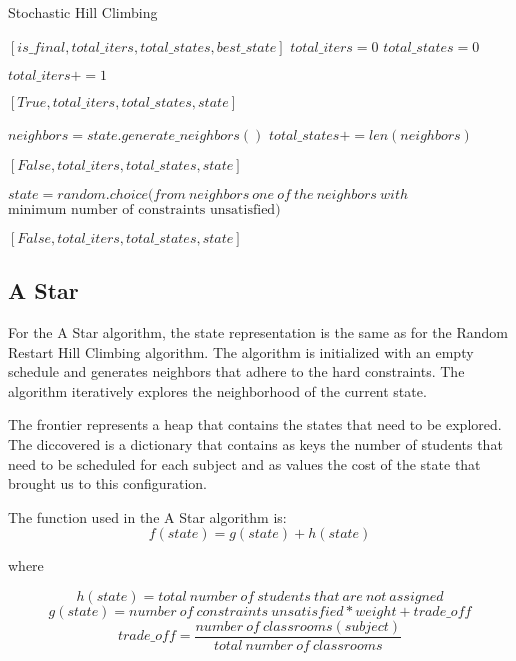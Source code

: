\documentclass[runningheads]{paper}
\begin{document}
\addtocounter{algorithm}{-1}
\begin{algorithm}
\caption{Stochastic Hill Climbing}
\begin{algorithmic}[1]
 \Return $[is\_final, total\_iters, total\_states, best\_state] $ 
\State $total\_iters = 0$
\State $total\_states = 0$

\State $total\_iters += 1$

\Return $[True, total\_iters, total\_states, state]$
\EndIf

\State $neighbors = state.generate\_neighbors()$
\State $total\_states += len(neighbors)$

\Return $[False, total\_iters, total\_states, state]$
\EndIf

\State $state = random.choice(from\ neighbors\ one\ of\ the\ neighbors\ with$ \\
\hspace*{2em}$\text{minimum\ number\ of\ constraints\ unsatisfied)}$
\EndWhile

\State \Return $[False, total\_iters, total\_states, state]$

\EndProcedure
\end{algorithmic}
\end{algorithm}


\subsection{A Star}
For the A Star algorithm, the state representation is the same as for the Random
Restart Hill Climbing algorithm. The algorithm is initialized with an empty
schedule and generates neighbors that adhere to the hard constraints. The 
algorithm iteratively explores the neighborhood of the current state.

The frontier represents a heap that contains the states that need to be explored.
The diccovered is a dictionary that contains as keys the number of students that
need to be scheduled for each subject and as values the cost of the state that
brought us to this configuration.

The function used in the A Star algorithm is:
\begin{equation}
    f(state) = g(state) + h(state)
\end{equation}

where

\begin{equation}
    h(state) = total\ number\ of\ students\ that\ are\ not\ assigned
\end{equation}
\begin{equation}
    g(state) = number\ of\ constraints\ unsatisfied * weight + trade\_off
\end{equation}
\begin{equation}
    trade\_off = \frac{number\ of\ classrooms(subject)}{total\ number\ of\ classrooms} 
\end{equation}
\end{document}
